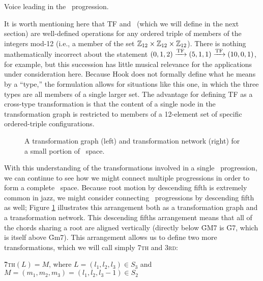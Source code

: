 \begin{example}[htbp]
  \caption{Voice leading in the \tfo\ progression.}
  \label{tf:tfo-voice-leading}
\end{example}

It is worth mentioning here that TF and \tft\ (which we will define in the
next section) are well-defined operations for any ordered triple of members of
the integers mod-12 (i.e., a member of the set $\mathbb{Z}_{12} \times \mathbb{Z}_{12}
\times \mathbb{Z}_{12}$). There is nothing mathematically incorrect
about the statement $(0, 1, 2) \xrightarrow{\mathrm{TF}} (5, 1, 1) \xrightarrow{\mathrm{TF}} (10, 0, 1)$, for
example, but this succession has little musical relevance for the applications
under consideration here. Because Hook does not formally define what he means
by a ``type,'' the formulation allows for situations like this one, in which
the three types are all members of a single larger set. The advantage
for defining TF as a cross-type transformation is that the content of a single
node in the transformation graph is restricted to members of a 12-element set
of specific ordered-triple configurations.

\begin{figure}[thbp]
  \caption[A transformation graph and network for a small portion of \tf\
    space]{A transformation graph (left) and transformation network (right)
    for a small portion of \tf\ space.}
  \label{tf:trans-graph-large}
\end{figure}

With this understanding of the transformations involved in a single \tfo\
progression, we can continue to see how we might connect multiple progressions
in order to form a complete \tf\ space. Because root motion by descending
fifth is extremely common in jazz, we might consider connecting \tfo\
progressions by descending fifth as well; Figure \ref{tf:trans-graph-large}
illustrates this arrangement both as a transformation graph and a
transformation network.  This descending fifths arrangement means that all of
the chords sharing a root are aligned vertically (directly below \h{GM7} is
\h{G7}, which is itself above \h{Gm7}). This arrangement allows us to define
two more transformations, which we will call simply \textsc{7th} and
\textsc{3rd}:

\vspace{0.5\baselineskip}
\h{7}\textsc{th}$(L) = M$, where $L = (l_1, l_2, l_3) \in S_3$ and $M=(m_1, m_2,
m_3)=(l_1, l_2, l_3-1) \in S_2$


